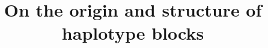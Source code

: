 \documentclass[twocolumn]{bmcart}%
\begin{document}
\begin{frontmatter}
\begin{fmbox}


\title{On the origin and structure of haplotype blocks}

\author[
  addressref={aff1,aff2,aff3}, 
   noteref={n1},%
  email={daria.shipilina@ebc.uu.se}   %
]{ }
\author[
  addressref={aff2}, 
   noteref={n1},%
  email={arka.pal@ist.ac.at}   %
]{ }
\author[
  addressref={aff2}, 
   noteref={n1},%
  email={sean.stankowski@ist.ac.at}   %
]{ }
\author[
  addressref={aff4}, 
  email={frank.chan@tue.mpg.de}   %
]{ }
\author[
  addressref={aff2}, 
  email={nick.barton@ist.ac.at}   %
]{ }



\end{fmbox}
\end{frontmatter}
\end{document}
